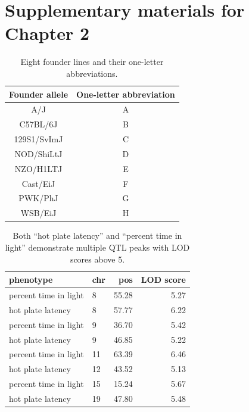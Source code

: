 \documentclass[oneside]{book}\usepackage[]{graphicx}\usepackage[]{color}
\begin{document}
\section{Supplementary materials for Chapter 2}\label{sec:ch2-supp}



\begin{table}
  \caption{Eight founder lines and their one-letter abbreviations.}
  \label{table-letters}
\begin{center}
\small
  \begin{tabular}{ c | c }
    \hline
    Founder allele & One-letter abbreviation \\ \hline
    A/J & A \\
    C57BL/6J & B \\
    129S1/SvImJ & C \\
    NOD/ShiLtJ & D\\
    NZO/H1LTJ & E\\
    Cast/EiJ & F\\
    PWK/PhJ & G\\
    WSB/EiJ & H\\
    \hline
  \end{tabular}

\end{center}
  \end{table}

\clearpage

\begin{table}
\caption{Both ``hot plate latency'' and ``percent time in light''
  demonstrate multiple QTL peaks with LOD scores above 5.}
  \label{table-peaks}
\begin{center}
\begin{tabular}{l|lrr}
  \hline
phenotype & chr & pos & LOD score \\
   \hline
percent time in light & 8 & 55.28 & 5.27 \\
 hot plate latency & 8 & 57.77 & 6.22 \\
 percent time in light & 9 & 36.70 & 5.42 \\
 hot plate latency & 9 & 46.85 & 5.22 \\
 percent time in light & 11 & 63.39 & 6.46 \\
 hot plate latency & 12 & 43.52 & 5.13 \\
 percent time in light & 15 & 15.24 & 5.67 \\
 hot plate latency & 19 & 47.80 & 5.48 \\
   \hline
\end{tabular}
\end{center}
\end{table}
\end{document}

